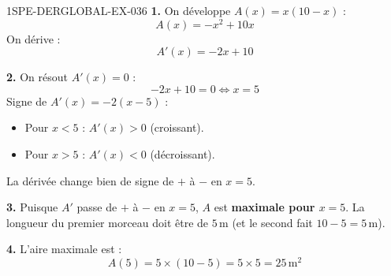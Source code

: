 \begin{corrige}{1SPE-DERGLOBAL-EX-036}
\textbf{1.} On développe $A(x) = x(10 - x)$ :
\[
A(x) = -x^2 + 10x
\]
On dérive :
\[
A'(x) = -2x + 10
\]

\textbf{2.} On résout $A'(x) = 0$ :
\[
-2x + 10 = 0 \iff x = 5
\]
Signe de $A'(x) = -2(x - 5)$ :
\begin{itemize}
\item Pour $x < 5$ : $A'(x) > 0$ (croissant).
\item Pour $x > 5$ : $A'(x) < 0$ (décroissant).
\end{itemize}
La dérivée change bien de signe de $+$ à $-$ en $x = 5$.

\textbf{3.} Puisque $A'$ passe de $+$ à $-$ en $x = 5$, $A$ est \textbf{maximale pour $x = 5$}. La longueur du premier morceau doit être de $5\,\text{m}$ (et le second fait $10 - 5 = 5\,\text{m}$).

\textbf{4.} L'aire maximale est :
\[
A(5) = 5 \times (10 - 5) = 5 \times 5 = \boxed{25\,\text{m}^2}
\]
\end{corrige}

